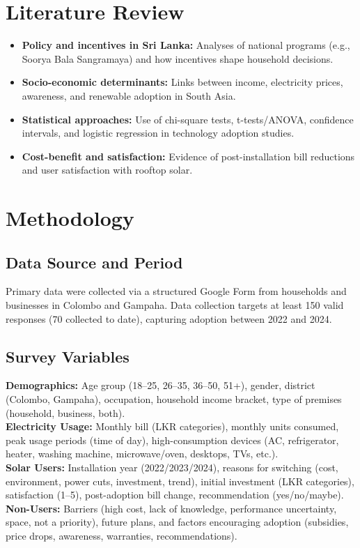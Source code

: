 \documentclass[12pt,a4paper]{article}
\begin{document}
\section{Literature Review}
\begin{itemize}[noitemsep,topsep=0pt]
    \item \textbf{Policy and incentives in Sri Lanka:} Analyses of national programs (e.g., Soorya Bala Sangramaya) and how incentives shape household decisions.
    \item \textbf{Socio\hyp{}economic determinants:} Links between income, electricity prices, awareness, and renewable adoption in South Asia.
    \item \textbf{Statistical approaches:} Use of chi\hyp{}square tests, t\hyp{}tests/ANOVA, confidence intervals, and logistic regression in technology adoption studies.
    \item \textbf{Cost\hyp{}benefit and satisfaction:} Evidence of post\hyp{}installation bill reductions and user satisfaction with rooftop solar.
\end{itemize}

\section{Methodology}
\subsection{Data Source and Period}
Primary data were collected via a structured Google Form from households and businesses in Colombo and Gampaha. Data collection targets at least 150 valid responses (70 collected to date), capturing adoption between 2022 and 2024.

\subsection{Survey Variables}
\textbf{Demographics:} Age group (18--25, 26--35, 36--50, 51+), gender, district (Colombo, Gampaha), occupation, household income bracket, type of premises (household, business, both).\\
\textbf{Electricity Usage:} Monthly bill (LKR categories), monthly units consumed, peak usage periods (time of day), high\hyp{}consumption devices (AC, refrigerator, heater, washing machine, microwave/oven, desktops, TVs, etc.).\\
\textbf{Solar Users:} Installation year (2022/2023/2024), reasons for switching (cost, environment, power cuts, investment, trend), initial investment (LKR categories), satisfaction (1--5), post\hyp{}adoption bill change, recommendation (yes/no/maybe).\\
\textbf{Non\hyp{}Users:} Barriers (high cost, lack of knowledge, performance uncertainty, space, not a priority), future plans, and factors encouraging adoption (subsidies, price drops, awareness, warranties, recommendations).
\end{document}

